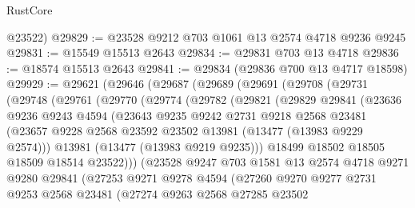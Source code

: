\begin{lexlean}{RustCore}
\begin{coremodule}
      @23522)
@29829 := @23528 @9212 @703 @1061 @13 @2574 @4718 @9236 @9245
@29831 := @15549 @15513 @2643
@29834 := @29831 @703 @13 @4718
@29836 := @18574 @15513 @2643
@29841 := @29834 (@29836 @700 @13 @4717 @18598)
@29929 := @29621
    (@29646
      (@29687
        (@29689
          (@29691
            (@29708
              (@29731
                (@29748
                  (@29761
                    (@29770
                      (@29774
                        (@29782
                          (@29821
                            (@29829
                              @29841
                              (@23636
                                @9236
                                @9243
                                @4594
                                (@23643
                                  @9235
                                  @9242
                                  @2731
                                  @9218
                                  @2568
                                  @23481
                                  (@23657
                                    @9228
                                    @2568
                                    @23592
                                    @23502
                                    @13981
                                    (@13477 (@13983 @9229 @2574)))
                                  @13981
                                  (@13477 (@13983 @9219 @9235)))
                                @18499
                                @18502
                                @18505
                                @18509
                                @18514
                                @23522)))
                          (@23528
                            @9247
                            @703
                            @1581
                            @13
                            @2574
                            @4718
                            @9271
                            @9280
                            @29841
                            (@27253
                              @9271
                              @9278
                              @4594
                              (@27260
                                @9270
                                @9277
                                @2731
                                @9253
                                @2568
                                @23481
                                (@27274
                                  @9263
                                  @2568
                                  @27285
                                  @23502

\end{coremodule}
\end{lexlean}
